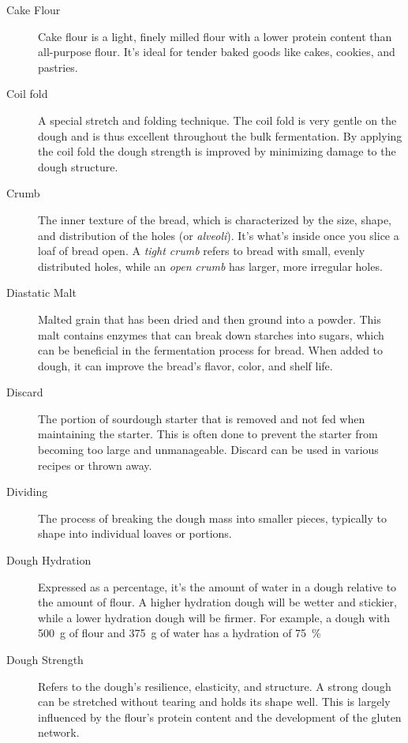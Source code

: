 \begin{description}
\item[Cake Flour] Cake flour is a light, finely milled flour with a lower protein
content than all-purpose flour. It's ideal for tender baked goods like cakes, cookies,
and pastries.

\item[Coil fold] A special stretch and folding technique. The coil fold is
very gentle on the dough and is thus excellent throughout the bulk fermentation.
By applying the coil fold the dough strength is improved by minimizing damage
to the dough structure.

\item[Crumb] The inner texture of the bread, which is characterized by the size,
shape, and distribution of the holes (or \emph{alveoli}). It's what's inside once you slice
a loaf of bread open. A \emph{tight crumb} refers to bread with small, evenly distributed
holes, while an \emph{open crumb} has larger, more irregular holes.

\item[Diastatic Malt] Malted grain that has been dried and then ground into a powder.
This malt contains enzymes that can break down starches into sugars, which can be
beneficial in the fermentation process for bread. When added to dough, it can improve
the bread's flavor, color, and shelf life.

\item[Discard] The portion of sourdough starter that is removed and not fed when
maintaining the starter. This is often done to prevent the starter from becoming too
large and unmanageable. Discard can be used in various recipes or thrown away.

\item[Dividing] The process of breaking the dough mass into smaller pieces,
typically to shape into individual loaves or portions.

\item[Dough Hydration] Expressed as a percentage, it's the amount of water in a
dough relative to the amount of flour. A higher hydration dough will be wetter and
stickier, while a lower hydration dough will be firmer. For example, a dough
with \SI{500}{\gram} of flour and \SI{375}{\gram} of water has a hydration of
\SI{75}{\percent}

\item[Dough Strength] Refers to the dough's resilience, elasticity, and structure.
A strong dough can be stretched without tearing and holds its shape well. This is
largely influenced by the flour's protein content and the development of the gluten
network.


\end{description}
